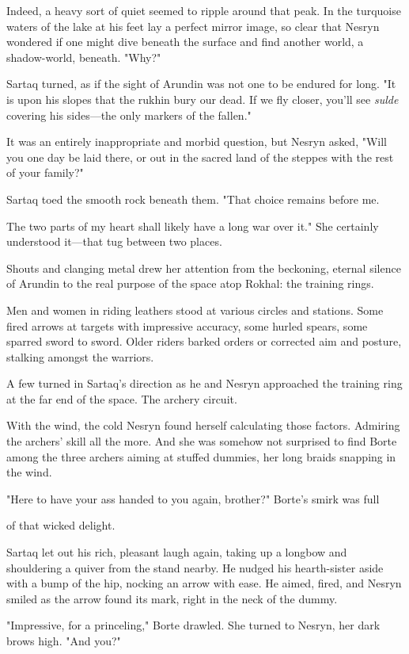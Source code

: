 Indeed, a heavy sort of quiet seemed to ripple around that peak. In the turquoise waters of the lake at his feet lay a perfect mirror image, so clear that Nesryn wondered if one might dive beneath the surface and find another world, a shadow-world, beneath. "Why?"

Sartaq turned, as if the sight of Arundin was not one to be endured for long. "It is upon his slopes that the rukhin bury our dead. If we fly closer, you'll see \emph{sulde} covering his sides---the only markers of the fallen."

It was an entirely inappropriate and morbid question, but Nesryn asked, "Will you one day be laid there, or out in the sacred land of the steppes with the rest of your family?"

Sartaq toed the smooth rock beneath them. "That choice remains before me.

The two parts of my heart shall likely have a long war over it." She certainly understood it---that tug between two places.

Shouts and clanging metal drew her attention from the beckoning, eternal silence of Arundin to the real purpose of the space atop Rokhal: the training rings.

Men and women in riding leathers stood at various circles and stations. Some fired arrows at targets with impressive accuracy, some hurled spears, some sparred sword to sword. Older riders barked orders or corrected aim and posture, stalking amongst the warriors.

A few turned in Sartaq's direction as he and Nesryn approached the training ring at the far end of the space. The archery circuit.

With the wind, the cold  Nesryn found herself calculating those factors. Admiring the archers' skill all the more. And she was somehow not surprised to find Borte among the three archers aiming at stuffed dummies, her long braids snapping in the wind.

"Here to have your ass handed to you again, brother?" Borte's smirk was full

of that wicked delight.

Sartaq let out his rich, pleasant laugh again, taking up a longbow and shouldering a quiver from the stand nearby. He nudged his hearth-sister aside with a bump of the hip, nocking an arrow with ease. He aimed, fired, and Nesryn smiled as the arrow found its mark, right in the neck of the dummy.

"Impressive, for a princeling," Borte drawled. She turned to Nesryn, her dark brows high. "And you?"

